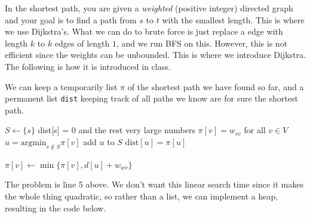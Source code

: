 \documentclass{article}
\begin{document}
    In the shortest path, you are given a \textit{weighted} (positive integer) directed graph and your goal is to find a path from $s$ to $t$ with the smallest length. This is where we use Dijkstra's. What we can do to brute force is just replace a edge with length $k$ to $k$ edges of length $1$, and we run BFS on this. However, this is not efficient since the weights can be unbounded. This is where we introduce Dijkstra. The following is how it is introduced in class. 

    \begin{algo}
      We can keep a temporarily list $\pi$ of the shortest path we have found so far, and a permanent list \texttt{dist} keeping track of all paths we know are for sure the shortest path. 
      \begin{algorithm}[H]
        \label{alg:dik_in_class}
        \begin{algorithmic}[1]
          \State $S \gets \{s\}$  
          \State dist[s] = 0 and the rest very large numbers 
          \State $\pi[v] = w_{sv}$ for all $v \in V$ 
            \State $u = \mathrm{argmin}_{v \notin S} \pi[v]$ 
            \State add $u$ to $S$ 
            \State $\mathrm{dist}[u] = \pi[u]$ 
            
             
              \State $\pi[v] \gets \min\{\pi[v], d[u] + w_{wv}\}$ 
            \EndFor
          \EndFunction
        \end{algorithmic}
      \end{algorithm}
    \end{algo}

    The problem is line 5 above. We don't want this linear search time since it makes the whole thing quadratic, so rather than a list, we can implement a heap, resulting in the code below. 
\end{document}
